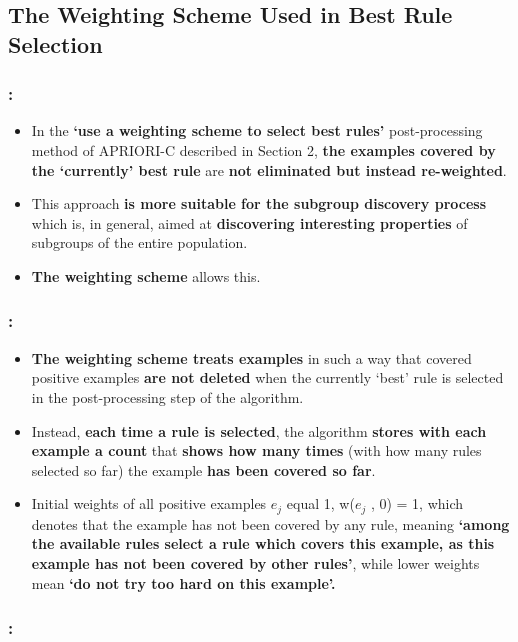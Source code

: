 \documentclass{beamer}
\begin{document}
\begin{CJK*}{UTF8}{bsmi}
\subsection{The Weighting Scheme Used in Best Rule Selection}
\begin{frame}
	\frametitle{\insertsection : \insertsubsection}
	\begin{block}{}
		\begin{itemize}
			\item In the \textbf{‘use a weighting scheme to select best rules’} post-processing method of APRIORI-C described in Section 2, \textbf{the examples covered by the ‘currently’ best rule} are \textbf{not eliminated but instead re-weighted}.
			\item This approach \textbf{is more suitable for the subgroup discovery process} which is, in general, aimed at \textbf{discovering interesting properties} of subgroups of the entire population.
			\item \textbf{The weighting scheme} allows this.
		\end{itemize}
	\end{block}
\end{frame}
\begin{frame}
	\frametitle{\insertsection : \insertsubsection}
	\begin{block}{}
		\begin{itemize}
			\item \textbf{The weighting scheme treats examples} in such a way that covered positive examples \textbf{are not deleted} when the currently ‘best’ rule is selected in the post-processing step of the algorithm.
			\item Instead, \textbf{each time a rule is selected}, the algorithm\textbf{ stores with each example a count }that \textbf{shows how many times }(with how many rules selected so far) the example \textbf{has been covered so far}.
			\item Initial weights of all positive examples $ e_{j}  $ equal 1, w($ e_{j}  $ , 0) = 1, which denotes that the example has not been covered by any rule, meaning \textbf{‘among the available rules select a rule which covers this example, as this example has not been covered by other rules’}, while lower weights mean \textbf{‘do not try too hard on this example’.}
		\end{itemize}
	\end{block}
\end{frame}
\begin{frame}
	\frametitle{\insertsection : \insertsubsection}

\end{frame}
\end{CJK*}
\end{document}
